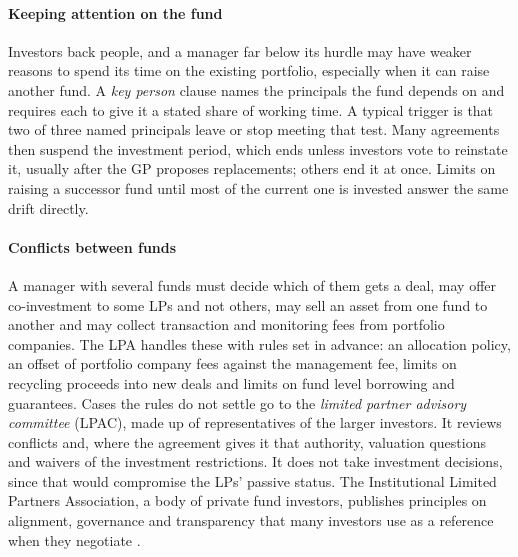 \begin{chapterrefs}
\paragraph{Keeping attention on the fund}
Investors back people, and a manager far below its hurdle may have weaker reasons to spend its time
on the existing portfolio, especially when it can raise another fund. A
\emph{key person} clause names the principals the fund depends on and requires each to give it a
stated share of working time. A typical trigger is that two of three named principals leave or stop
meeting that test. Many agreements then suspend the investment period, which ends unless investors
vote to reinstate it, usually after the GP proposes replacements; others end it at once. Limits on
raising a successor fund until most of the current one is invested answer the same drift directly.

\paragraph{Conflicts between funds}
A manager with several funds must decide which of them gets a deal, may offer co-investment to some
LPs and not others, may sell an asset from one fund to another and may collect transaction and
monitoring fees from portfolio companies. The LPA handles these with rules set in advance: an
allocation policy, an offset of portfolio company fees against the management fee, limits on
recycling proceeds into new deals and limits on fund level borrowing and guarantees. Cases the rules
do not settle go to the \emph{limited partner advisory committee} (LPAC), made up of representatives
of the larger investors. It reviews conflicts and, where the agreement gives it that authority,
valuation questions and waivers of the investment restrictions. It does not take investment
decisions, since that would compromise the LPs' passive status. The Institutional Limited Partners
Association, a body of private fund investors, publishes principles on alignment, governance and
transparency that many investors use as a reference when they negotiate \parencite{ilpa2019}.


\end{chapterrefs}
